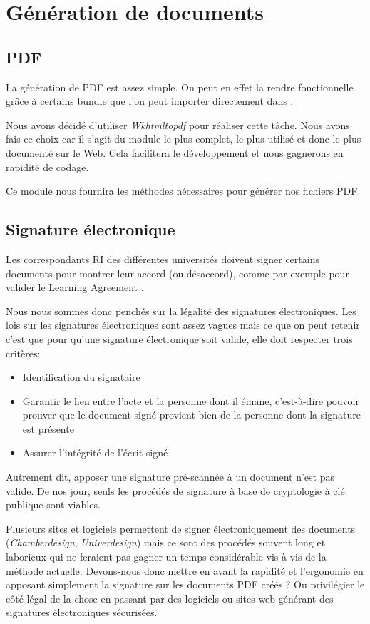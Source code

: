 \section{Génération de documents}
\subsection{PDF}

La génération de PDF est assez simple. On peut en effet la rendre fonctionnelle grâce à certains bundle que l'on peut importer directement dans \symfony.

Nous avons décidé d'utiliser \textit{Wkhtmltopdf} pour réaliser cette tâche.
Nous avons fais ce choix car il s'agit du module le plus complet, le plus utilisé et donc le plus documenté sur le Web. Cela facilitera le développement et nous gagnerons en rapidité de codage.

Ce module nous fournira les méthodes nécessaires pour générer nos fichiers PDF.


\subsection{Signature électronique}
Les correspondants RI des différentes universités doivent signer certains documents pour montrer leur accord (ou désaccord), comme par exemple pour valider le \og Learning Agreement \fg.

Nous nous sommes donc penchés sur la légalité des signatures électroniques.
Les lois sur les signatures électroniques sont assez vagues mais ce que on peut retenir c'est que pour qu'une signature électronique soit valide, elle doit respecter trois critères:
\begin{itemize}
\item Identification du signataire
\item Garantir le lien entre l'acte et la personne dont il émane, c'est-à-dire pouvoir prouver que le document signé provient bien de la personne dont la signature est présente
\item Assurer l'intégrité de l'écrit signé
\end{itemize}
Autrement dit, apposer une signature pré-scannée à un document n'est pas valide.
De nos jour, seuls les procédés de signature à base de cryptologie à clé publique sont viables.

Plusieurs sites et logiciels permettent de signer électroniquement des documents (\textit{Chamberdesign}, \textit{Univerdesign}) mais ce sont des procédés souvent long et laborieux qui ne feraient pas gagner un temps considérable vis à vis de la méthode actuelle.
Devons-nous donc mettre en avant la rapidité et l'ergonomie en apposant simplement la signature sur les documents PDF créés ? Ou privilégier le côté légal de la chose en passant par des logiciels ou sites web générant des signatures électroniques sécurisées.

